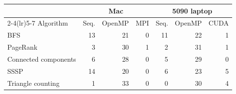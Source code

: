 \begin{tabular}{@{}lrrrrrr@{}}
\toprule
 & \multicolumn{3}{c}{Mac} & \multicolumn{3}{c}{5090 laptop} \\
\cmidrule(lr){2-4}\cmidrule(lr){5-7}
Algorithm & Seq. & OpenMP & MPI & Seq. & OpenMP & CUDA \\
\midrule
BFS & 13 & 21 & 0 & 11 & 22 & 1 \\
PageRank & 3 & 30 & 1 & 2 & 31 & 1 \\
Connected components & 6 & 28 & 0 & 5 & 29 & 0 \\
SSSP & 14 & 20 & 0 & 6 & 23 & 5 \\
Triangle counting & 1 & 33 & 0 & 0 & 30 & 4 \\
\bottomrule
\end{tabular}
